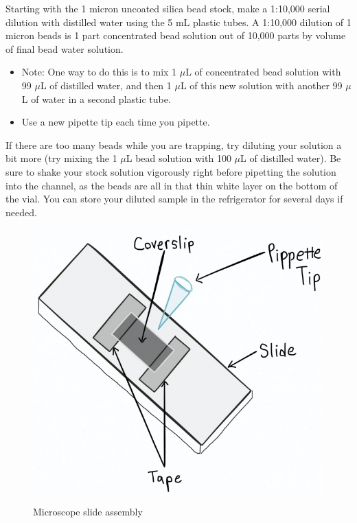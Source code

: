 \documentclass{../lab}
\begin{document}
Starting with the 1 micron uncoated silica bead stock, make a 1:10,000 serial dilution with distilled water using the 5 mL plastic tubes. A 1:10,000 dilution of 1 micron beads is 1 part concentrated bead solution out of 10,000 parts by volume of final bead water solution.

\begin{itemize}
    \item Note: One way to do this is to mix 1 $\mu$L of concentrated bead solution with 99 $\mu$L of distilled water, and then 1 $\mu$L of this new solution with another 99 $\mu$L of water in a second plastic tube.

    \item Use a new pipette tip each time you pipette.
\end{itemize}

If there are too many beads while you are trapping, try diluting your solution a bit more (try mixing the 1 $\mu$L bead solution with 100 $\mu$L of distilled water). Be sure to shake your stock solution vigorously right before pipetting the solution into the channel, as the beads are all in that thin white layer on the bottom of the vial. You can store your diluted sample in the refrigerator for several days if needed.

\begin{figure}[h]
    \centering
    \href{http://experimentationlab.berkeley.edu/sites/default/files/images/OTZSlide.jpg}{\includegraphics[width=0.5\linewidth]{images/OTZSlide.jpg}}
    \caption{Microscope slide assembly}
    \label{fig:OTZSlide}
\end{figure}
\end{document}
